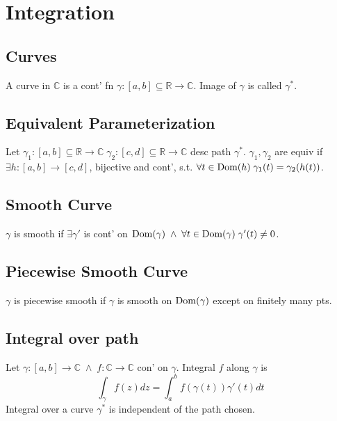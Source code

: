 \section{Integration} %
\label{sec:integration}

\subsection{Curves} %
\label{sub:curves}
A curve in $\mathbb{C}$ is a cont' fn $\gamma : [a, b] \subseteq \mathbb{R} \to \mathbb{C}$. Image of $\gamma$ is called $\gamma^*$.

\subsection{Equivalent Parameterization} %
\label{sub:equivalent_parameterization}
Let $\gamma_1 : [a, b] \subseteq \mathbb{R} \to \mathbb{C} \; \gamma_2 : [c, d] \subseteq \mathbb{R} \to \mathbb{C}$ desc path $\gamma^*$. $\gamma_1, \gamma_2$ are equiv if $\exists h : [a, b] \to [c, d]$, bijective and cont', s.t. $\forall t \in \operatorname{Dom}(h) \; \gamma_1 (t) = \gamma_2(h(t))$.

\subsection{Smooth Curve} %
\label{sub:smooth_curve}
$\gamma$ is smooth if $\exists \gamma'$ is cont' on $\operatorname{Dom}(\gamma) \; \land \; \forall t \in \operatorname{Dom}(\gamma) \; \gamma'(t) \neq 0$.

\subsection{Piecewise Smooth Curve} %
\label{sub:piecewise_smooth_curve}
$\gamma$ is piecewise smooth if $\gamma$ is smooth on $\operatorname{Dom}(\gamma)$ except on finitely many pts.

\subsection{Integral over path} %
\label{sub:integral_over_path}
Let $\gamma: [a, b] \to \mathbb{C} \; \land \; f : \mathbb{C} \to \mathbb{C}$ con' on $\gamma$. Integral $f$ along $\gamma$ is
\begin{equation*}
	\int_{\gamma} f(z) dz = \int_{a}^{b} f(\gamma(t))\gamma'(t) dt
\end{equation*}
Integral over a curve $\gamma^*$ is independent of the path chosen.

